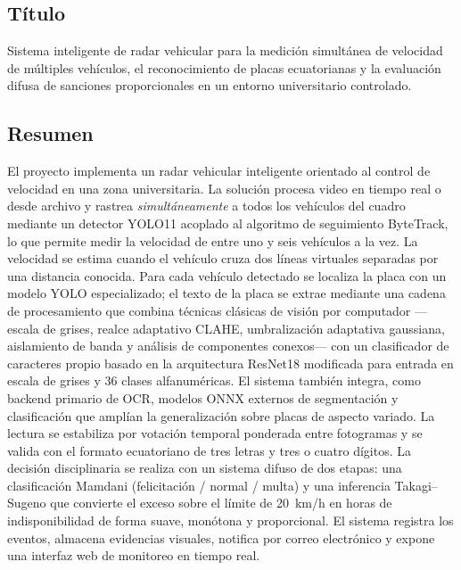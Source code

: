 \documentclass[11pt]{article}
\begin{document}
\subsection{Título}
Sistema inteligente de radar vehicular para la medición simultánea de velocidad de
múltiples vehículos, el reconocimiento de placas ecuatorianas y la evaluación difusa
de sanciones proporcionales en un entorno universitario controlado.

\subsection{Resumen}
El proyecto implementa un radar vehicular inteligente orientado al control de velocidad
en una zona universitaria. La solución procesa video en tiempo real o desde archivo y
rastrea \emph{simultáneamente} a todos los vehículos del cuadro mediante un detector
YOLO11 acoplado al algoritmo de seguimiento ByteTrack, lo que permite medir la
velocidad de entre uno y seis vehículos a la vez. La velocidad se estima cuando el
vehículo cruza dos líneas virtuales separadas por una distancia conocida. Para cada
vehículo detectado se localiza la placa con un modelo YOLO especializado; el texto de
la placa se extrae mediante una cadena de procesamiento que combina técnicas clásicas
de visión por computador ---escala de grises, realce adaptativo CLAHE, umbralización
adaptativa gaussiana, aislamiento de banda y análisis de componentes conexos--- con un
clasificador de caracteres propio basado en la arquitectura ResNet18 \cite{resnet}
modificada para entrada en escala de grises y 36 clases alfanuméricas. El sistema
también integra, como backend primario de OCR, modelos ONNX externos de segmentación
y clasificación que amplían la generalización sobre placas de aspecto variado. La
lectura se estabiliza por votación temporal ponderada entre fotogramas y se valida con
el formato ecuatoriano de tres letras y tres o cuatro dígitos. La decisión
disciplinaria se realiza con un sistema difuso de dos etapas: una clasificación Mamdani
(felicitación / normal / multa) \cite{mamdani} y una inferencia Takagi--Sugeno
\cite{sugeno} que convierte el exceso sobre el límite de 20~km/h en horas de
indisponibilidad de forma suave, monótona y proporcional. El sistema registra los
eventos, almacena evidencias visuales, notifica por correo electrónico y expone una
interfaz web de monitoreo en tiempo real.
\end{document}
